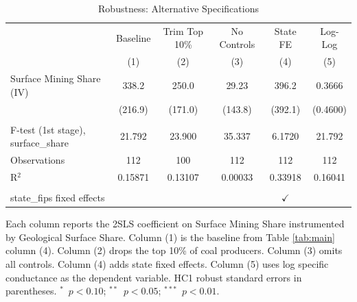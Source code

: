 
\begin{table}[htbp]
   \caption{\label{tab:robust} Robustness: Alternative Specifications}
   \bigskip
   \centering
   \footnotesize
   \begin{tabular}{lccccc}
      \toprule
                                          & Baseline & Trim Top 10\%  & No Controls & State FE      & Log-Log \\   
                                          & (1)      & (2)            & (3)         & (4)           & (5)\\  
      \midrule 
      Surface Mining Share (IV)           & 338.2    & 250.0          & 29.23       & 396.2         & 0.3666\\   
                                          & (216.9)  & (171.0)        & (143.8)     & (392.1)       & (0.4600)\\   
       \\
      F-test (1st stage), surface\_share  & 21.792   & 23.900         & 35.337      & 6.1720        & 21.792\\  
      Observations                        & 112      & 100            & 112         & 112           & 112\\  
      R$^2$                               & 0.15871  & 0.13107        & 0.00033     & 0.33918       & 0.16041\\  
       \\
      state\_fips fixed effects           &          &                &             & $\checkmark$  & \\  
      \bottomrule
   \end{tabular}
   
   \par \raggedright 
   Each column reports the 2SLS coefficient on Surface Mining Share instrumented by Geological Surface Share. Column (1) is the baseline from Table \ref{tab:main} column (4). Column (2) drops the top 10\% of coal producers. Column (3) omits all controls. Column (4) adds state fixed effects. Column (5) uses log specific conductance as the dependent variable. HC1 robust standard errors in parentheses. $^{*}$~$p<0.10$; $^{**}$~$p<0.05$; $^{***}$~$p<0.01$.
\end{table}


